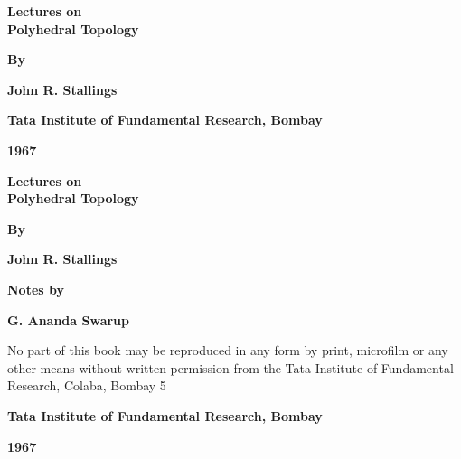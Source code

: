 \thispagestyle{empty}
\begin{center}
{\Large\bf Lectures on}\\[5pt] 
{\Large\bf Polyhedral Topology}
\vfill

{\bf By}
\medskip

{\large\bf John R. Stallings}
\vfill

{\bf Tata Institute of Fundamental Research, Bombay}

{\bf 1967}

\end{center}

\eject

\thispagestyle{empty}
\begin{center}
{\Large\bf Lectures on}\\[5pt] 
{\Large\bf Polyhedral Topology}
\vfill

{\bf By}
\medskip

{\large\bf John R. Stallings}
\vfill

{\bf Notes by}
\medskip

{\large\bf G. Ananda Swarup}
\vfill

\parbox{0.7\textwidth}{No part of this book may be reproduced
in any form by print, microfilm or any other means without written permission
from the Tata Institute of Fundamental Research, Colaba, Bombay 5}
\vfill

{\bf Tata Institute of Fundamental Research, Bombay}

{\bf 1967}
\end{center}

\eject

